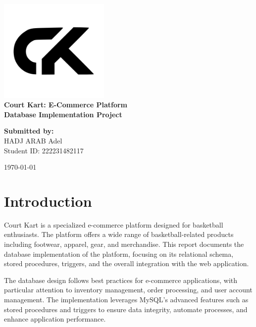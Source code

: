 \documentclass[13pt,a4paper]{article}
\begin{document}
\begin{titlepage}
	\centering
	\vspace*{1cm}

	\includegraphics[width=0.4\textwidth]{../public/assets/images/court-kart-logo.png}\\[1.5cm]

	\textbf{\LARGE Court Kart: E-Commerce Platform}\\[0.5cm]
	\textbf{\Large Database Implementation Project}\\[2cm]

	\begin{minipage}{0.45\textwidth}
		\begin{flushleft}
			\large
			\textbf{Submitted by:}\\
			HADJ ARAB Adel\\
			Student ID: 222231482117\\
		\end{flushleft}
	\end{minipage}

	\vfill

	{\large \today}

\end{titlepage}

\newpage
\tableofcontents
\newpage

\section{Introduction}

Court Kart is a specialized e-commerce platform designed for basketball enthusiasts. The platform offers a wide range of basketball-related products including footwear, apparel, gear, and merchandise. This report documents the database implementation of the platform, focusing on its relational schema, stored procedures, triggers, and the overall integration with the web application.

The database design follows best practices for e-commerce applications, with particular attention to inventory management, order processing, and user account management. The implementation leverages MySQL's advanced features such as stored procedures and triggers to ensure data integrity, automate processes, and enhance application performance.
\end{document}
